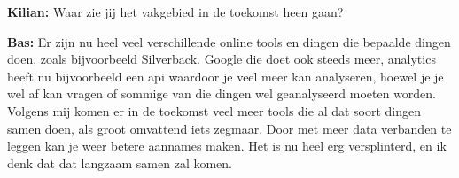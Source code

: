 \textbf{Kilian:} Waar zie jij het vakgebied in de toekomst heen gaan?

\textbf{Bas:} Er zijn nu heel veel verschillende online tools en dingen die bepaalde dingen doen, zoals bijvoorbeeld Silverback. Google die doet ook steeds meer, analytics heeft nu bijvoorbeeld een api waardoor je veel meer kan analyseren, hoewel je je wel af kan vragen of sommige van die dingen wel geanalyseerd moeten worden. Volgens mij komen er in de toekomst veel meer tools die al dat soort dingen samen doen, als groot omvattend iets zegmaar. Door met meer data verbanden te leggen kan je weer betere aannames maken. Het is nu heel erg versplinterd, en ik denk dat dat langzaam samen zal komen.

